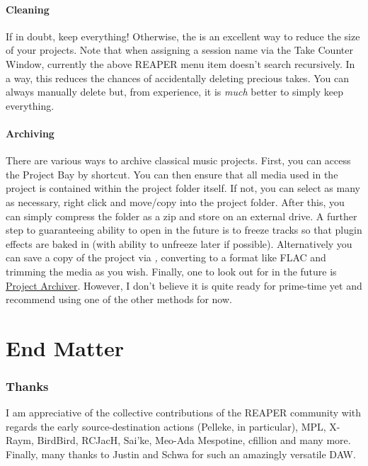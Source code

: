 \documentclass[10pt,american]{article}
\begin{document}
\subsection{Cleaning}

If in doubt, keep everything! Otherwise, the  is an excellent way to reduce the size of your projects. Note that
when assigning a session name via the Take Counter Window, currently the above
REAPER menu item doesn't search recursively. In a way, this reduces the chances
of accidentally deleting precious takes. You can always manually delete but,
from experience, it is \emph{much} better to simply keep everything.

\subsection{Archiving}

There are various ways to archive classical music projects. First, you can
access the Project Bay by  shortcut. You can then ensure that all
media used in the project is contained within the project folder itself. If not,
you can select as many as necessary, right click and move/copy into the project
folder. After this, you can simply compress the folder as a zip and store on an
external drive. A further step to guaranteeing ability to open in the future is
to freeze tracks so that plugin effects are baked in (with ability to unfreeze
later if possible). Alternatively you can save a copy of the project via
 \emph{,} converting to a format like FLAC and
trimming the media as you wish. Finally, one to look out for in the future is
\href{https://forum.cockos.com/showthread.php?t=280150}{Project Archiver}.
However, I don't believe it is quite ready for prime-time yet and recommend
using one of the other methods for now.\pagebreak{}

\part{End Matter}

\section{Thanks}
\noindent\begin{flushleft} I am appreciative of the collective contributions of
the REAPER community with regards the early source-destination actions (Pelleke,
in particular), MPL, X-Raym, BirdBird, RCJacH, Sai'ke, Meo-Ada Mespotine,
cfillion and many more. Finally, many thanks to Justin and Schwa for such an
amazingly versatile DAW. \par\end{flushleft}
\end{document}
